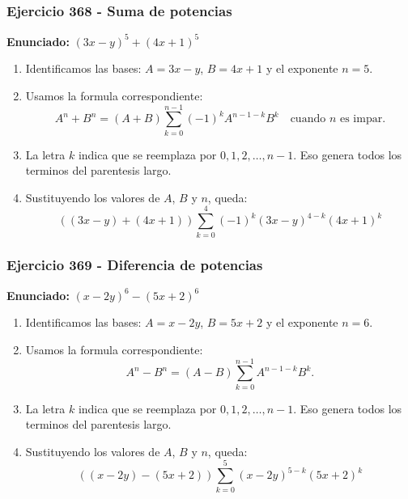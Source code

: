 \documentclass[11pt,a4paper]{article}
\begin{document}
\subsubsection*{Ejercicio 368 - Suma de potencias}
\textbf{Enunciado:} $ \left(3 x - y\right)^{5}+\left(4 x + 1\right)^{5} $\par
\begin{enumerate}[leftmargin=2em]
\item Identificamos las bases: \(A=3 x - y\), \(B=4 x + 1\) y el exponente \(n=5\).
\item Usamos la formula correspondiente: \[A^n+B^n=(A+B)\sum_{k=0}^{n-1}(-1)^kA^{n-1-k}B^k\quad\text{cuando }n\text{ es impar}.\]
\item La letra \(k\) indica que se reemplaza por \(0,1,2,\ldots,n-1\). Eso genera todos los terminos del parentesis largo.
\item Sustituyendo los valores de \(A\), \(B\) y \(n\), queda: \[\boxed{\left(\left(3 x - y\right)+\left(4 x + 1\right)\right)\sum_{k=0}^{4}(-1)^k\left(3 x - y\right)^{4-k}\left(4 x + 1\right)^k}\]
\end{enumerate}

\vspace{0.2cm}
\subsubsection*{Ejercicio 369 - Diferencia de potencias}
\textbf{Enunciado:} $ \left(x - 2 y\right)^{6}-\left(5 x + 2\right)^{6} $\par
\begin{enumerate}[leftmargin=2em]
\item Identificamos las bases: \(A=x - 2 y\), \(B=5 x + 2\) y el exponente \(n=6\).
\item Usamos la formula correspondiente: \[A^n-B^n=(A-B)\sum_{k=0}^{n-1}A^{n-1-k}B^k.\]
\item La letra \(k\) indica que se reemplaza por \(0,1,2,\ldots,n-1\). Eso genera todos los terminos del parentesis largo.
\item Sustituyendo los valores de \(A\), \(B\) y \(n\), queda: \[\boxed{\left(\left(x - 2 y\right)-\left(5 x + 2\right)\right)\sum_{k=0}^{5}\left(x - 2 y\right)^{5-k}\left(5 x + 2\right)^k}\]
\end{enumerate}

\vspace{0.2cm}
\end{document}
